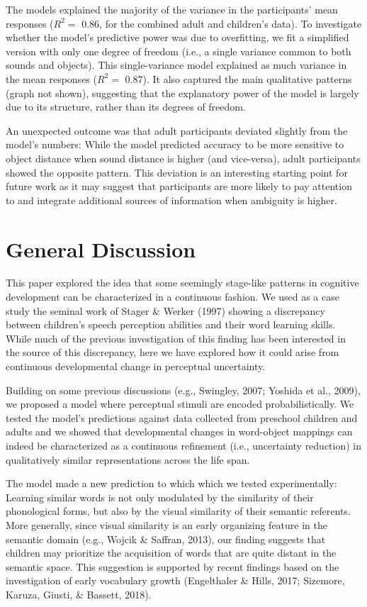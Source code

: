 \documentclass[10pt, letterpaper]{article}
\begin{document}
The models explained the majority of the variance in the participants'
mean responses (\(R^2=\) 0.86, for the combined adult and children's
data). To investigate whether the model's predictive power was due to
overfitting, we fit a simplified version with only one degree of freedom
(i.e., a single variance common to both sounds and objects). This
single-variance model explained as much variance in the mean responses
(\(R^2=\) 0.87). It also captured the main qualitative patterns (graph
not shown), suggesting that the explanatory power of the model is
largely due to its structure, rather than its degrees of freedom.

An unexpected outcome was that adult participants deviated slightly from
the model's numbers: While the model predicted accuracy to be more
sensitive to object distance when sound distance is higher (and
vice-versa), adult participants showed the opposite pattern. This
deviation is an interesting starting point for future work as it may
suggest that participants are more likely to pay attention to and
integrate additional sources of information when ambiguity is higher.

\section{General Discussion}\label{general-discussion}

This paper explored the idea that some seemingly stage-like patterns in
cognitive development can be characterized in a continuous fashion. We
used as a case study the seminal work of Stager \& Werker (1997) showing
a discrepancy between children's speech perception abilities and their
word learning skills. While much of the previous investigation of this
finding has been interested in the source of this discrepancy, here we
have explored how it could arise from continuous developmental change in
perceptual uncertainty.

Building on some previous discussions (e.g., Swingley, 2007; Yoshida et
al., 2009), we proposed a model where perceptual stimuli are encoded
probabilistically. We tested the model's predictions against data
collected from preschool children and adults and we showed that
developmental changes in word-object mappings can indeed be
characterized as a continuous refinement (i.e., uncertainty reduction)
in qualitatively similar representations across the life span.

The model made a new prediction to which which we tested experimentally:
Learning similar words is not only modulated by the similarity of their
phonological forms, but also by the visual similarity of their semantic
referents. More generally, since visual similarity is an early
organizing feature in the semantic domain (e.g., Wojcik \& Saffran,
2013), our finding suggests that children may prioritize the acquisition
of words that are quite distant in the semantic space. This suggestion
is supported by recent findings based on the investigation of early
vocabulary growth (Engelthaler \& Hills, 2017; Sizemore, Karuza, Giusti,
\& Bassett, 2018).
\end{document}
